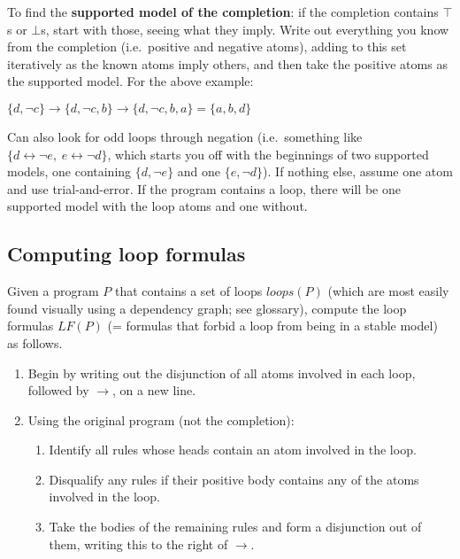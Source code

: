 \documentclass[9pt,a4paper,landscape]{article}
\begin{document}
{To find the \textbf{supported model of the completion}: if the completion contains $\top$s or $\bot$s, start with those, seeing what they imply.
Write out everything you know from the completion (i.e.\ positive and negative atoms), adding to this set iteratively as the known atoms imply others, and then take the positive atoms as the supported model.
For the above example:
\vspace{-.5\baselineskip}
\begin{center}
	$\{d, \neg c\} \rightarrow \{d, \neg c, b\} \rightarrow \{d, \neg c, b, a\} = \{a, b, d\}$
\end{center}
\vspace{-.5\baselineskip}
Can also look for odd loops through negation (i.e.\ something like $\{ d \leftrightarrow \neg e, \hspace{3pt}  e \leftrightarrow \neg d \}$, which starts you off with the beginnings of two supported models, one containing $\{d, \neg e\}$ and one $\{e, \neg d\}$). If nothing else, assume one atom and use trial-and-error. If the program contains a loop, there will be one supported model with the loop atoms and one without.

\pagebreak


\subsection{Computing loop formulas}
\label{subsec:lf}

Given a program $P$ that contains a set of loops $loops(P)$ (which are most easily found visually using a dependency graph; see glossary), compute the loop formulas $LF(P)$ (= formulas that forbid a loop from being in a stable model) as follows.

\begin{enumerate}[noitemsep]
	\item Begin by writing out the disjunction of all atoms involved in each loop, followed by $\rightarrow$, on a new line.
	\item Using the original program (not the completion):
	\begin{enumerate}[noitemsep]
		\item Identify all rules whose heads contain an atom involved in the loop.
		\item Disqualify any rules if their positive body contains any of the atoms involved in the loop.
		\item Take the bodies of the remaining rules and form a disjunction out of them, writing this to the right of $\rightarrow$.
	\end{enumerate}
\end{enumerate}

}
\end{document}
